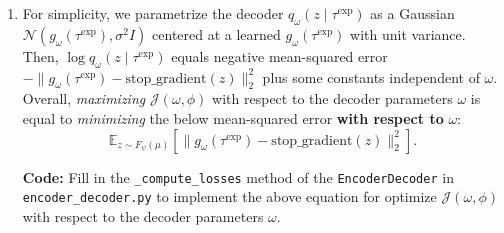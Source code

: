 \documentclass[12pt]{article}
\begin{document}
\begin{enumerate}[label=\alph*)]
    \item
        For simplicity, we parametrize the decoder $q_\omega(z \mid \tau^\text{exp})$ as a Gaussian $\mathcal{N}(g_{\omega}(\tau^\text{exp}), \sigma^2I)$ centered at a learned $g_\omega(\tau^\text{exp})$ with unit variance.
        Then, $\log q_\omega(z \mid \tau^\text{exp})$ equals negative mean-squared error $-\lVert g_\omega(\tau^\text{exp}) - \text{stop\_gradient}(z) \rVert^2_2$ plus some constants independent of $\omega$.
        Overall, \emph{maximizing} $\mathcal{J}(\omega, \phi)$ with respect to the decoder parameters $\omega$ is equal to \emph{minimizing} the below mean-squared error \textbf{with respect to} $\omega$:
        \begin{equation*}
            \mathbb{E}_{z \sim F_\psi(\mu)} \left[ \lVert g_\omega(\tau^\text{exp}) - \text{stop\_gradient}(z) \rVert^2_2 \right].
        \end{equation*}
        
        \textbf{Code:} Fill in the \texttt{\_compute\_losses} method of the \texttt{EncoderDecoder} in \texttt{encoder\_decoder.py} to implement the above equation for optimize $\mathcal{J}(\omega, \phi)$ with respect to the decoder parameters $\omega$.


\end{enumerate}
\end{document}
